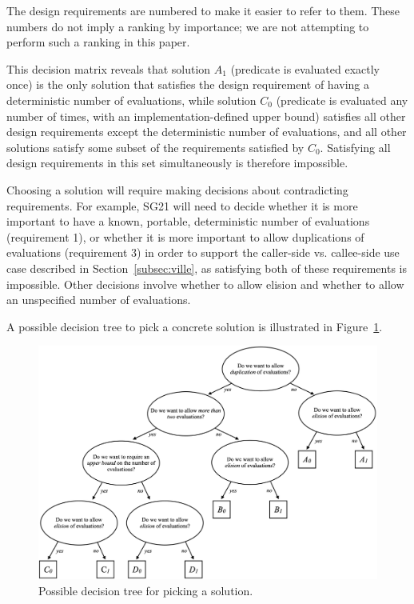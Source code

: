 
The design requirements are numbered to make it easier to refer to them. These numbers do not imply a ranking by importance; we are not attempting to perform such a ranking in this paper.

This decision matrix reveals that solution $A_1$ (predicate is evaluated exactly once) is the only solution that satisfies the design requirement of having a deterministic number of evaluations, while solution $C_0$ (predicate is evaluated any number of times, with an implementation-defined upper bound) satisfies all other design requirements except the deterministic number of evaluations, and all other solutions satisfy some subset of the requirements satisfied by $C_0$. Satisfying all design requirements in this set simultaneously is therefore impossible.

Choosing a solution will require making decisions about contradicting requirements. For example, SG21 will need to decide  whether it is more important to have a known, portable, deterministic number of evaluations (requirement 1), or whether it is more important to allow duplications of evaluations (requirement 3) in order to support the caller-side vs. callee-side use case described in Section~\ref{subsec:ville}, as satisfying both of these requirements is impossible. Other decisions involve whether to allow elision and whether to allow an unspecified number of evaluations.

A possible decision tree to pick a concrete solution is illustrated in Figure~\ref{fig:prepost}.

\begin{figure}%
\centering
  \includegraphics[width=1\linewidth]{images/p3228_fig1.png}
  \vspace{5mm}
  \caption{Possible decision tree for picking a solution.}
  \label{fig:prepost}
\end{figure}

